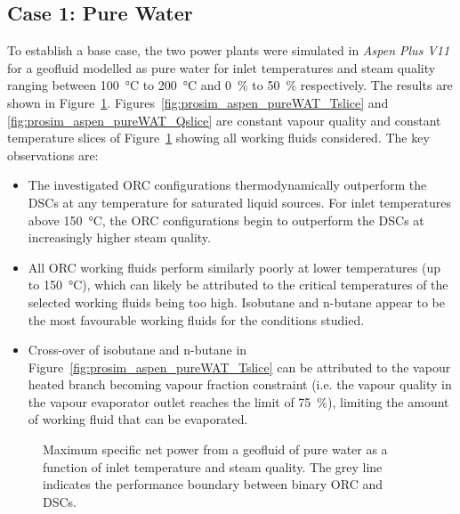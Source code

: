 \subsection{Case 1: Pure Water}
    To establish a base case, the two power plants were simulated in \emph{Aspen Plus V11} for a geofluid modelled as pure water for inlet temperatures and steam quality ranging between \qty{100}{\degreeCelsius} to \qty{200}{\degreeCelsius} and \qty{0}{\percent} to \qty{50}{\percent} respectively. The results are shown in Figure~\ref{fig:prosim_aspen_pureWAT_map}. Figures~\ref{fig:prosim_aspen_pureWAT_Tslice} and \ref{fig:prosim_aspen_pureWAT_Qslice} are constant vapour quality and constant temperature slices of Figure~\ref{fig:prosim_aspen_pureWAT_map} showing all working fluids considered. The key observations are:
    \begin{itemize}
        \item The investigated \ac{ORC} configurations thermodynamically outperform the \ac{DSC}s at any temperature for saturated liquid sources. For inlet temperatures above \qty{150}{\degreeCelsius}, the \ac{ORC} configurations begin to outperform the \ac{DSC}s at increasingly higher steam quality.
        \item All \ac{ORC} working fluids perform similarly poorly at lower temperatures (up to \qty{150}{\degreeCelsius}), which can likely be attributed to the critical temperatures of the selected working fluids being too high. Isobutane and n-butane appear to be the most favourable working fluids for the conditions studied.
        \item Cross-over of isobutane and n-butane in Figure~\ref{fig:prosim_aspen_pureWAT_Tslice} can be attributed to the vapour heated branch becoming vapour fraction constraint (i.e. the vapour quality in the vapour evaporator outlet reaches the limit of \qty{75}{\percent}), limiting the amount of working fluid that can be evaporated.
    \end{itemize}

    \begin{figure}[H]
        \centering
        
        \caption[Maximum specific net power from a geofluid of pure water.]{Maximum specific net power from a geofluid of pure water as a function of inlet temperature and steam quality. The grey line indicates the performance boundary between binary \ac{ORC} and \ac{DSC}s.}
        \label{fig:prosim_aspen_pureWAT_map}
    \end{figure}

